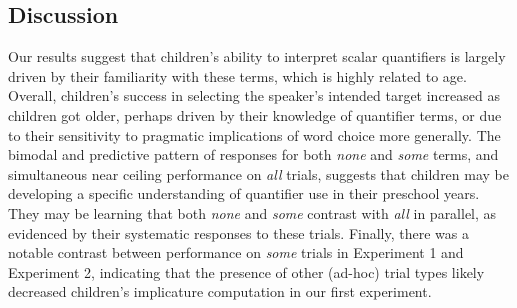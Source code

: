 \documentclass[10pt,letterpaper]{article}
\begin{document}

\subsection{Discussion}

Our results suggest that children's ability to interpret scalar quantifiers is largely driven by their familiarity with these terms, which is highly related to age. Overall, children's success in selecting the speaker's intended target increased as children got older, perhaps driven by their knowledge of quantifier terms, or due to their sensitivity to pragmatic implications of word choice more generally. The bimodal and predictive pattern of responses for both \emph{none} and \emph{some} terms, and simultaneous near ceiling performance on \emph{all} trials, suggests that children may be developing a specific understanding of quantifier use in their preschool years. They may be learning that both \emph{none} and \emph{some} contrast with \emph{all} in parallel, as evidenced by their systematic responses to these trials. Finally, there was a notable contrast between performance on \emph{some} trials in Experiment 1 and Experiment 2, indicating that the presence of other (ad-hoc) trial types likely decreased children's implicature computation in our first experiment. 

\end{document}
